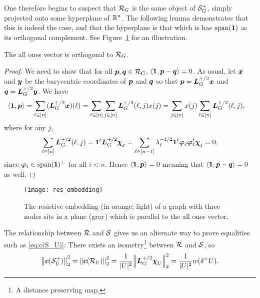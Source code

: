 One therefore begins to suspect that $\mathcal{R}_G$ is the same object of  $\mathcal{S}_G^+$, simply projected onto some hyperplane of $\mathbb{R}^n$. The following lemma  demonstrates that this is indeed the  case, and  that  the hyperplane  is that which is has $\textnormal{span}(\vb{1})$ as its orthogonal complement. See Figure~\ref{fig:res_embedding} for an  illustration. 

\begin{lemma}
	The all ones vector is orthogonal to $\mathcal{R}_G$. 
\end{lemma}
\begin{proof}
	We need to show that for all $\vb*{p},\vb*{q}\in\mathcal{R}_G$, $\langle \vb{1},\vb*{p}-\vb*{q}\rangle=0$. As usual, let $\vb*{x}$ and $\vb*{y}$ be the barycentric coordinates of $\vb*{p}$ and $\vb*{q}$ so that $\vb*{p}=\vb*{L}_G^{+/2}\vb*{x}$ and $\vb*{q}=\vb*{L}_G^{+/2}\vb*{y}$. We have
	\begin{align*}
	\langle \vb{1},\vb*{p}\rangle &= \sum_{\ell\in[n]} (\vb*{L}_G^{+/2}\vb*{x})(\ell) = \sum_{\ell\in[n]} \sum_{j\in [n]}\vb*{L}_G^{+/2}(\ell,j)x(j) = \sum_{j\in[n]}x(j) \sum_{\ell\in[n]}\vb*{L}_G^{+/2}(\ell,j),
	\end{align*}
	where for any $j$, 
	\[\sum_{\ell\in[n]}\vb*{L}_G^{+/2}(\ell,j)= \vb{1}^t \vb*{L}_G^{+/2}\boldsymbol{\chi}_j=\sum_{\ell\in[n-1]} \lambda_\ell^{-1/2}\vb{1}^t \vb*{\varphi}_\ell\vb*{\varphi}_\ell^t\boldsymbol{\chi}_j=0,\]
	since $\vb*{\varphi}_i\in\textnormal{span}(\vb{1})^\perp$  for all $i<n$. Hence  $\langle \vb{1},\vb*{p}\rangle=0$ meaning that $\langle \vb{1},\vb*{p}-\vb*{q}\rangle=0$ as well. 
\end{proof}

\begin{figure}
	\centering
	\texttt{[image: res\_embedding]}
	\caption{The resistive embedding (in orange;  light) of a graph with three nodes sits in a plane (gray) which is parallel to the all ones vector. }
	\label{fig:res_embedding}
\end{figure}

The relationship between $\mathcal{R}$ and $\mathcal{S}$ gives us an alternate way to prove equalities such as \eqref{eq:c(S_U)}: There exists an isometry\footnote{A distance preserving map.} between $\mathcal{R}$ and $\mathcal{S}$, so 
\begin{equation*}
\norm{\vb*{c}(\mathcal{S}^+_U)}_2^2 = \norm{\vb*{c}(\mathcal{R}_U)}_2^2 = \frac{1}{|U|^2} \norm{\vb*{L}_G^{+/2}\boldsymbol{\chi}_U}_2^2 = \frac{1}{|U|^2}w(\delta^+ U).
\end{equation*}


